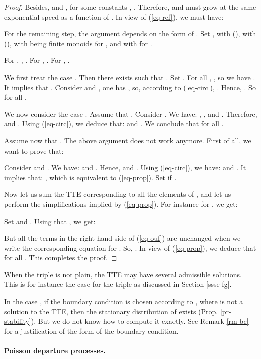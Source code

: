 \documentclass[11pt,a4paper]{article}
\theoremstyle{remark}
\def\eref#1{(\ref{#1})}
\begin{document}
\begin{proof}
Besides,  and , for some constants ,
. Therefore,  and  must grow at the
same exponential speed as a function of . In view of \eref{eq-ref},
we must have: 


For the remaining step, the argument depends on the form of .
Set , with
(), with
 (), with  being
finite monoids for , and with
 for .

For , , . For , . For
, . 

\medskip

We first treat the case .
Then there exists  such that . Set . 
For all , , so we have
. It implies that .
Consider  and , one
has , so, according to \eref{eq-circ},
. Hence, .
So  for all .

\medskip

We now consider the case .
Assume that . Consider . We have: ,
, and . Therefore,  and . Using \eref{eq-circ}, we deduce that:
 and
. We conclude that
 for all .

\medskip

Assume now that . The above argument does not work anymore.
First of all, we want to prove that:

Consider  and . We have:
 and . Hence,  and . Using \eref{eq-circ}, we
have:  and . It implies that:
, which is equivalent to
\eref{eq-prop}. Set
 if .


Now let us sum the TTE corresponding to all the elements of
, and let us perform the simplifications implied by
\eref{eq-prop}. For instance for , we get:

Set  and .
Using that , we get:

But all the terms in the right-hand side of \eref{eq-ouf} are
unchanged when we write the corresponding equation for .
So, . In view of \eref{eq-prop}, we
deduce that  for all .
This completes the proof. 
\end{proof}

When the triple is not plain, the TTE may have several
admissible solutions. This is for instance the case for the triple
 as discussed in Section
\ref{ssse-fg}. 

\remark In the case , if the boundary condition is chosen
according to , where  is not a solution to the TTE,
then the stationary distribution of  exists
(Prop. \ref{pr-stability}). But we do not know 
how to compute it exactly. 
See Remark \ref{rm-bc} for a
justification of the form of the boundary condition. 




\paragraph{Poisson departure processes.}  \\
\end{document}
